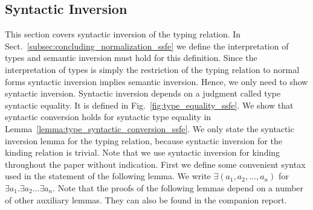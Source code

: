 \subsection{Syntactic Inversion}
\label{subsec:basic_syntactic_lemmas_ssfe}
This section covers syntactic inversion of the typing relation.  In
Sect.~\ref{subsec:concluding_normalization_ssfe} we define the
interpretation of types and semantic inversion must hold for this
definition.  Since the interpretation of types is simply the
restriction of the typing relation to normal forms syntactic inversion
implies semantic inversion.  Hence, we only need to show syntactic
inversion.  Syntactic inversion depends on a judgment called type
syntactic equality.  It is defined in
Fig.~\ref{fig:type_equality_ssfe}.  We show that syntactic
conversion holds for syntactic type equality in
Lemma~\ref{lemma:type_syntactic_conversion_ssfe}.  We only state the
syntactic inversion lemma for the typing relation, because syntactic
inversion for the kinding relation is trivial.  Note that we use
syntactic inversion for kinding throughout the paper without
indication.  First we define some convenient syntax used in the
statement of the following lemma.  We write $\exists
(a_1,a_2,\ldots,a_n)$ for $\exists a_1.\exists a_2\ldots\exists a_n$.
Note that the proofs of the following lemmas depend on a number of
other auxiliary lemmas.  They can also be found in the companion
report.

